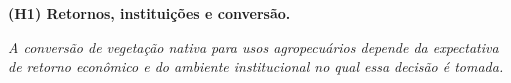 \medskip

\noindent\textbf{(H1) Retornos, instituições e conversão.}

\noindent\emph{A conversão de vegetação nativa para usos agropecuários depende da expectativa de retorno econômico e do ambiente institucional no qual essa decisão é tomada.}

\medskip

%
%
%



%
%

